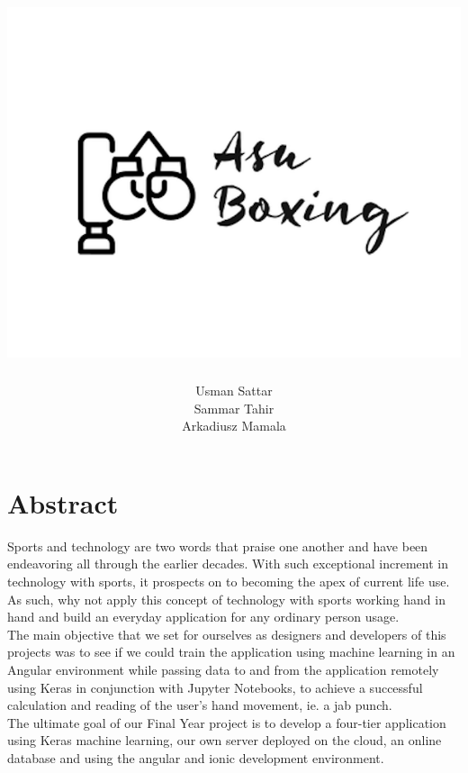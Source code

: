 \documentclass[a4paper,12pt]{report}
\begin{document}
\title{\includegraphics[width=0.7\columnwidth]{images/logo.png}}
\author{Usman Sattar \\ Sammar Tahir \\ Arkadiusz Mamala}
\maketitle
\preface
\vskip 1in \par
\section*{Abstract}
Sports and technology are two words that praise one another and have been endeavoring all through the earlier decades. With such exceptional increment in technology with sports, it prospects on to becoming the apex of current life use. As such, why not apply this concept of technology with sports working hand in hand and build an everyday application for any ordinary person usage.\\

The main objective that we set for ourselves as designers and developers of this projects was to see if we could train the application using machine learning in an Angular environment while passing 
data to and from the application remotely using Keras in conjunction with Jupyter Notebooks, to achieve a successful calculation and reading of the user's hand movement, ie. a jab punch.\\

The ultimate goal of our Final Year project is to develop a four-tier application using Keras machine learning, our own server deployed on the cloud, an online database and using the angular and ionic development environment.\\
\end{document}
